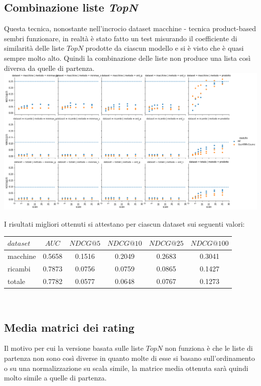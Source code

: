 \subsection{Combinazione liste \textit{TopN}}
Questa tecnica, nonostante nell'incrocio dataset macchine - tecnica product-based sembri funzionare, in realtà è stato fatto un test misurando il coefficiente di similarità delle liste $TopN$ prodotte da ciascun modello e si è visto che è quasi sempre molto alto. Quindi la combinazione delle liste non produce una lista così diversa da quelle di partenza.\\

\includegraphics[width=16cm]{figures/comb_1.png}

I risultati migliori ottenuti si attestano per ciascun dataset sui seguenti valori:\\

\begin{tabular}{|l|ccccc|}
    \toprule
    $dataset$ & $AUC$ & $NDCG@5$ & $NDCG@10$  & $NDCG@25$ & $NDCG@100$  \\
    \midrule
    macchine & 0.5658   &0.1516 & 0.2049 & 0.2683 & 0.3041 \\
    ricambi &  0.7873  &0.0756 & 0.0759 & 0.0865 & 0.1427 \\
    totale  & 0.7782   &0.0577 & 0.0648 & 0.0767 & 0.1273 \\
\bottomrule
\end{tabular}\\


\subsection{Media matrici dei rating}
Il motivo per cui la versione basata sulle liste $TopN$ non funziona è che le liste di partenza non sono così diverse in quanto molte di esse si basano sull'ordinamento o su una normalizzazione su scala simile, la matrice media ottenuta sarà quindi molto simile a quelle di partenza.\\

